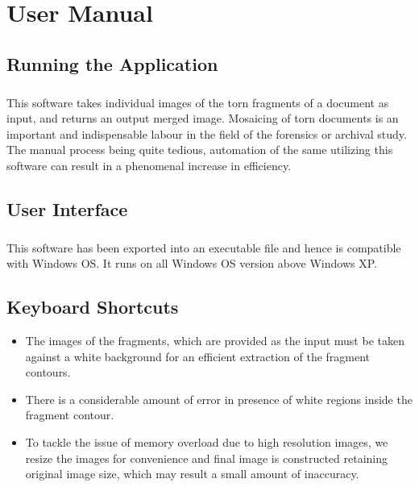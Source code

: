 \documentclass[12pts]{scrreprt}
\begin{document}
\chapter{User Manual} 

\section{Running the Application}
\paragraph{}
This software takes individual images of the torn fragments of a document as input, and returns an output merged image. Mosaicing of torn documents is an important and indispensable labour in the field of the forensics or archival study. The manual process being quite tedious, automation of the same utilizing this software can result in a phenomenal increase in efficiency.



\section{User Interface}
\paragraph{}
This software has been exported into an executable file and hence is compatible with Windows OS. It runs on all Windows OS version above Windows XP.

\section{Keyboard Shortcuts}

\begin{itemize}

\item The images of the fragments, which are provided as the input must be taken against a white background for an efficient extraction of the fragment contours.

\item There is a considerable amount of error in presence of white regions inside the fragment contour.

\item To tackle the issue of memory overload due to high resolution images, we resize the images for convenience and final image is constructed retaining original image size, which may result a small amount of inaccuracy.

\end{itemize}
  
\end{document}
